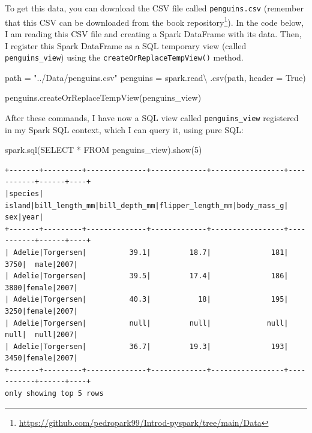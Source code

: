 \documentclass[
  11pt,
  letterpaper,
  DIV=11,
  numbers=noendperiod]{scrreprt}
\newenvironment{Shaded}{\begin{snugshade}}{\end{snugshade}}
\newcommand{\DecValTok}[1]{\textcolor[rgb]{0.68,0.00,0.00}{#1}}
\newcommand{\NormalTok}[1]{\textcolor[rgb]{0.00,0.23,0.31}{#1}}
\newcommand{\OperatorTok}[1]{\textcolor[rgb]{0.37,0.37,0.37}{#1}}
\newcommand{\StringTok}[1]{\textcolor[rgb]{0.13,0.47,0.30}{#1}}
\newcommand{\VariableTok}[1]{\textcolor[rgb]{0.07,0.07,0.07}{#1}}
\begin{document}
To get this data, you can download the CSV file called
\texttt{penguins.csv} (remember that this CSV can be downloaded from the
book repository\footnote{\url{https://github.com/pedropark99/Introd-pyspark/tree/main/Data}}).
In the code below, I am reading this CSV file and creating a Spark
DataFrame with its data. Then, I register this Spark DataFrame as a SQL
temporary view (called \texttt{penguins\_view}) using the
\texttt{createOrReplaceTempView()} method.

\begin{Shaded}
\begin{Highlighting}[]
\NormalTok{path }\OperatorTok{=} \StringTok{"../Data/penguins.csv"}
\NormalTok{penguins }\OperatorTok{=}\NormalTok{ spark.read}\OperatorTok{\textbackslash{}}
\NormalTok{  .csv(path, header }\OperatorTok{=} \VariableTok{True}\NormalTok{)}
  
\NormalTok{penguins.createOrReplaceTempView(}\StringTok{\textquotesingle{}penguins\_view\textquotesingle{}}\NormalTok{)}
\end{Highlighting}
\end{Shaded}

After these commands, I have now a SQL view called
\texttt{penguins\_view} registered in my Spark SQL context, which I can
query it, using pure SQL:

\begin{Shaded}
\begin{Highlighting}[]
\NormalTok{spark.sql(}\StringTok{\textquotesingle{}SELECT * FROM penguins\_view\textquotesingle{}}\NormalTok{).show(}\DecValTok{5}\NormalTok{)}
\end{Highlighting}
\end{Shaded}

\begin{verbatim}
+-------+---------+--------------+-------------+-----------------+-----------+------+----+
|species|   island|bill_length_mm|bill_depth_mm|flipper_length_mm|body_mass_g|   sex|year|
+-------+---------+--------------+-------------+-----------------+-----------+------+----+
| Adelie|Torgersen|          39.1|         18.7|              181|       3750|  male|2007|
| Adelie|Torgersen|          39.5|         17.4|              186|       3800|female|2007|
| Adelie|Torgersen|          40.3|           18|              195|       3250|female|2007|
| Adelie|Torgersen|          null|         null|             null|       null|  null|2007|
| Adelie|Torgersen|          36.7|         19.3|              193|       3450|female|2007|
+-------+---------+--------------+-------------+-----------------+-----------+------+----+
only showing top 5 rows
\end{verbatim}
\end{document}
